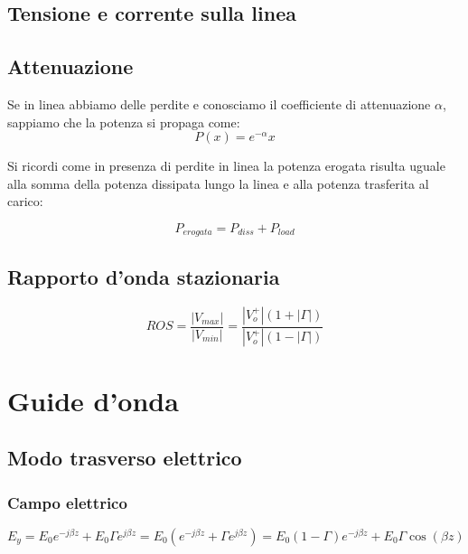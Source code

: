 \documentclass[10pt,a4paper]{report}
\begin{document}
	\section{Tensione e corrente sulla linea}

	\section{Attenuazione}

		Se in linea abbiamo delle perdite e conosciamo il coefficiente di attenuazione $\alpha$, sappiamo che la potenza si propaga come:
		\begin{equation}
		P(x)=e^{-\alpha}x
		\end{equation}

		Si ricordi come in presenza di perdite in linea la potenza erogata risulta uguale alla somma della potenza dissipata lungo la linea e alla potenza trasferita al carico:

		\begin{equation}
		P_{erogata}=P_{diss}+P_{load}
		\end{equation}

	\section{Rapporto d'onda stazionaria}

	\begin{equation}
	ROS=\frac{|V_{max}|}{|V_{min}|}=\frac{|V_o^+|(1+|\Gamma|)}{|V_o^+|(1-|\Gamma|)}
	\end{equation}

\chapter{Guide d'onda}
		
	\section{Modo trasverso elettrico}

		\subsection{Campo elettrico}
				\begin{equation}
				E_y= E_0e^{-j\beta z}+E_0 \Gamma e^{j \beta z}=E_0(e^{-j \beta z}+\Gamma e^{j \beta z}) =E_0(1 - \Gamma)e^{-j \beta z} + E_0 \Gamma \cos(\beta z)
				\end{equation}
\end{document}
